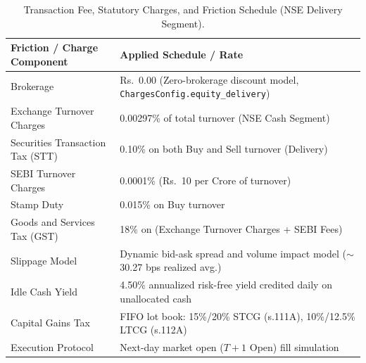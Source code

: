 \begin{table}[htbp]
\centering
\caption{Transaction Fee, Statutory Charges, and Friction Schedule (NSE Delivery Segment).}
\label{tab:appendix_frictions}
\begin{tabular}{ll}
\hline\hline
\textbf{Friction / Charge Component} & \textbf{Applied Schedule / Rate} \\
\hline
Brokerage & \textsf{Rs.~}0.00 (Zero-brokerage discount model, \texttt{ChargesConfig.equity\_delivery}) \\
Exchange Turnover Charges & 0.00297\% of total turnover (NSE Cash Segment) \\
Securities Transaction Tax (STT) & 0.10\% on both Buy and Sell turnover (Delivery) \\
SEBI Turnover Charges & 0.0001\% (\textsf{Rs.~}10 per Crore of turnover) \\
Stamp Duty & 0.015\% on Buy turnover \\
Goods and Services Tax (GST) & 18\% on (Exchange Turnover Charges + SEBI Fees) \\
Slippage Model & Dynamic bid-ask spread and volume impact model ($\sim$30.27 bps realized avg.) \\
Idle Cash Yield & 4.50\% annualized risk-free yield credited daily on unallocated cash \\
Capital Gains Tax & FIFO lot book: 15\%/20\% STCG (s.111A), 10\%/12.5\% LTCG (s.112A) \\
Execution Protocol & Next-day market open ($T+1$ Open) fill simulation \\
\hline\hline
\end{tabular}
\end{table}
